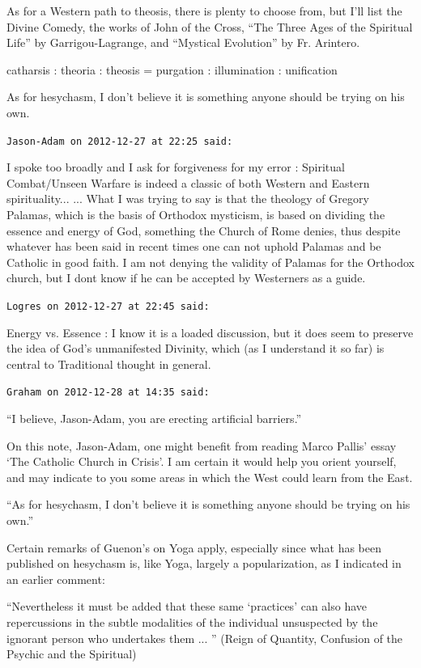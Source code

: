 \begin{footnotesize}
\begin{sffamily}
As for a Western path to theosis, there is plenty to choose from, but I'll list the Divine Comedy, the works of John of the Cross, ``The Three Ages of the Spiritual Life'' by Garrigou-Lagrange, and ``Mystical Evolution'' by Fr. Arintero.

catharsis : theoria : theosis = purgation : illumination : unification

As for hesychasm, I don't believe it is something anyone should be trying on his own.

\hfill

\texttt{Jason-Adam on 2012-12-27 at 22:25 said:}

I spoke too broadly and I ask for forgiveness for my error : Spiritual Combat/Unseen Warfare is indeed a classic of both Western and Eastern spirituality... ... What I was trying to say is that the theology of Gregory Palamas, which is the basis of Orthodox mysticism, is based on dividing the essence and energy of God, something the Church of Rome denies, thus despite whatever has been said in recent times one can not uphold Palamas and be Catholic in good faith. I am not denying the validity of Palamas for the Orthodox church, but I dont know if he can be accepted by Westerners as a guide.

\hfill

\texttt{Logres on 2012-12-27 at 22:45 said:}

Energy vs. Essence : I know it is a loaded discussion, but it does seem to preserve the idea of God's unmanifested Divinity, which (as I understand it so far) is central to Traditional thought in general.

\hfill

\texttt{Graham on 2012-12-28 at 14:35 said:}

``I believe, Jason-Adam, you are erecting artificial barriers.''

On this note, Jason-Adam, one might benefit from reading Marco Pallis' essay `The Catholic Church in Crisis'. I am certain it would help you orient yourself, and may indicate to you some areas in which the West could learn from the East.

``As for hesychasm, I don't believe it is something anyone should be trying on his own.''

Certain remarks of Guenon's on Yoga apply, especially since what has been published on hesychasm is, like Yoga, largely a popularization, as I indicated in an earlier comment:

``Nevertheless it must be added that these same `practices' can also have repercussions in the subtle modalities of the individual unsuspected by the ignorant person who undertakes them ... '' (Reign of Quantity, Confusion of the Psychic and the Spiritual)


\end{sffamily}
\end{footnotesize}

